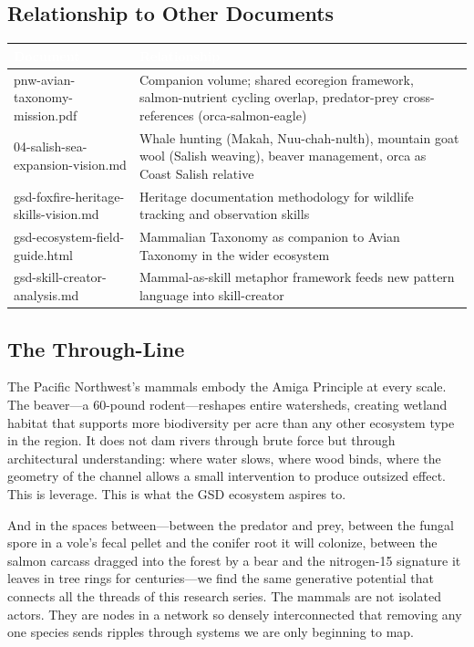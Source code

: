 \documentclass[11pt,letterpaper]{article}
\newcommand{\tableheader}[1]{\textbf{\sffamily\textcolor{white}{#1}}}
\begin{document}
\subsection{Relationship to Other Documents}

\begin{center}
\begin{tabularx}{\textwidth}{L{4.5cm}X}
\toprule
{}
\tableheader{Document} & \tableheader{Relationship} \\
\midrule
pnw-avian-taxonomy-mission.pdf & Companion volume; shared ecoregion framework, salmon-nutrient cycling overlap, predator-prey cross-references (orca-salmon-eagle) \\
04-salish-sea-expansion-vision.md & Whale hunting (Makah, Nuu-chah-nulth), mountain goat wool (Salish weaving), beaver management, orca as Coast Salish relative \\
gsd-foxfire-heritage-skills-vision.md & Heritage documentation methodology for wildlife tracking and observation skills \\
gsd-ecosystem-field-guide.html & Mammalian Taxonomy as companion to Avian Taxonomy in the wider ecosystem \\
gsd-skill-creator-analysis.md & Mammal-as-skill metaphor framework feeds new pattern language into skill-creator \\
\bottomrule
\end{tabularx}
\end{center}

\subsection{The Through-Line}

The Pacific Northwest's mammals embody the Amiga Principle at every scale. The beaver---a 60-pound rodent---reshapes entire watersheds, creating wetland habitat that supports more biodiversity per acre than any other ecosystem type in the region. It does not dam rivers through brute force but through architectural understanding: where water slows, where wood binds, where the geometry of the channel allows a small intervention to produce outsized effect. This is leverage. This is what the GSD ecosystem aspires to.

And in the spaces between---between the predator and prey, between the fungal spore in a vole's fecal pellet and the conifer root it will colonize, between the salmon carcass dragged into the forest by a bear and the nitrogen-15 signature it leaves in tree rings for centuries---we find the same generative potential that connects all the threads of this research series. The mammals are not isolated actors. They are nodes in a network so densely interconnected that removing any one species sends ripples through systems we are only beginning to map.
\end{document}
